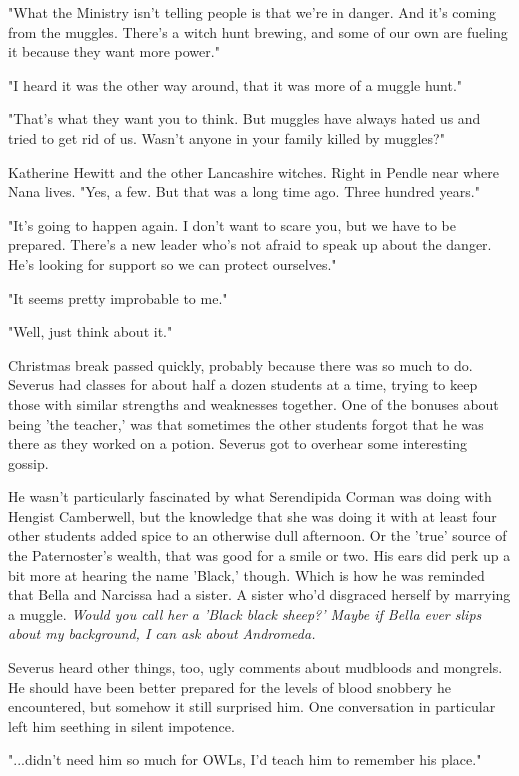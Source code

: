 \documentclass[a4paper,11pt]{article}
\begin{document}
"What the Ministry isn't telling people is that we're in danger. And it's coming from the muggles. There's a witch hunt brewing, and some of our own are fueling it because they want more power."

"I heard it was the other way around, that it was more of a muggle hunt."

"That's what they want you to think. But muggles have always hated us and tried to get rid of us. Wasn't anyone in your family killed by muggles?"

Katherine Hewitt and the other Lancashire witches. Right in Pendle near where Nana lives. "Yes, a few. But that was a long time ago. Three hundred years."

"It's going to happen again. I don't want to scare you, but we have to be prepared. There's a new leader who's not afraid to speak up about the danger. He's looking for support so we can protect ourselves."

"It seems pretty improbable to me."

"Well, just think about it."

Christmas break passed quickly, probably because there was so much to do. Severus had classes for about half a dozen students at a time, trying to keep those with similar strengths and weaknesses together. One of the bonuses about being 'the teacher,' was that sometimes the other students forgot that he was there as they worked on a potion. Severus got to overhear some interesting gossip.

He wasn't particularly fascinated by what Serendipida Corman was doing with Hengist Camberwell, but the knowledge that she was doing it with at least four other students added spice to an otherwise dull afternoon. Or the 'true' source of the Paternoster's wealth, that was good for a smile or two. His ears did perk up a bit more at hearing the name 'Black,' though. Which is how he was reminded that Bella and Narcissa had a sister. A sister who'd disgraced herself by marrying a muggle. \emph{Would you call her a 'Black black sheep?' Maybe if Bella ever slips about my background, I can ask about Andromeda.}

Severus heard other things, too, ugly comments about mudbloods and mongrels. He should have been better prepared for the levels of blood snobbery he encountered, but somehow it still surprised him. One conversation in particular left him seething in silent impotence.

"...didn't need him so much for OWLs, I'd teach him to remember his place."
\end{document}
